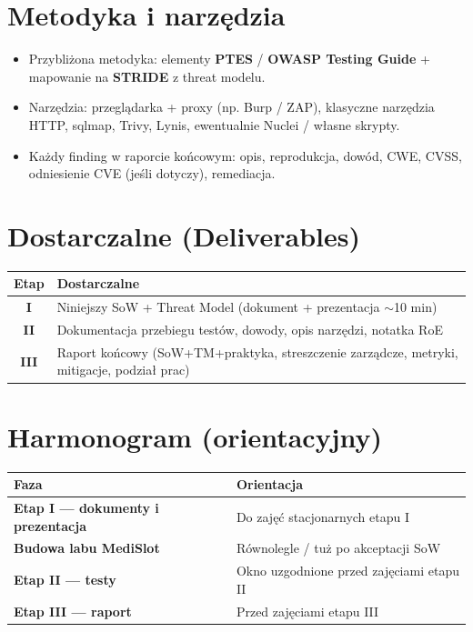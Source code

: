 \documentclass[11pt,a4paper]{article}
\begin{document}
\section{Metodyka i narzędzia}
\begin{itemize}[leftmargin=*]
  \item Przybliżona metodyka: elementy \textbf{PTES} / \textbf{OWASP Testing Guide} + mapowanie na \textbf{STRIDE} z threat modelu.
  \item Narzędzia: przeglądarka + proxy (np. Burp / ZAP), klasyczne narzędzia HTTP, sqlmap, Trivy, Lynis, ewentualnie Nuclei / własne skrypty.
  \item Każdy finding w raporcie końcowym: opis, reprodukcja, dowód, CWE, CVSS, odniesienie CVE (jeśli dotyczy), remediacja.
\end{itemize}

\section{Dostarczalne (Deliverables)}

\begin{tabularx}{\textwidth}{@{}>{\bfseries}c L@{}}
\toprule
\normalfont\textbf{Etap} & \textbf{Dostarczalne} \\
\midrule
I & Niniejszy SoW + Threat Model (dokument + prezentacja $\sim$10 min) \\
II & Dokumentacja przebiegu testów, dowody, opis narzędzi, notatka RoE \\
III & Raport końcowy (SoW+TM+praktyka, streszczenie zarządcze, metryki, mitigacje, podział prac) \\
\bottomrule
\end{tabularx}

\section{Harmonogram (orientacyjny)}

\begin{tabularx}{\textwidth}{@{}>{\bfseries}L L@{}}
\toprule
\normalfont\textbf{Faza} & \textbf{Orientacja} \\
\midrule
Etap I — dokumenty i prezentacja & Do zajęć stacjonarnych etapu I \\
Budowa labu MediSlot & Równolegle / tuż po akceptacji SoW \\
Etap II — testy & Okno uzgodnione przed zajęciami etapu II \\
Etap III — raport & Przed zajęciami etapu III \\
\bottomrule
\end{tabularx}
\end{document}
